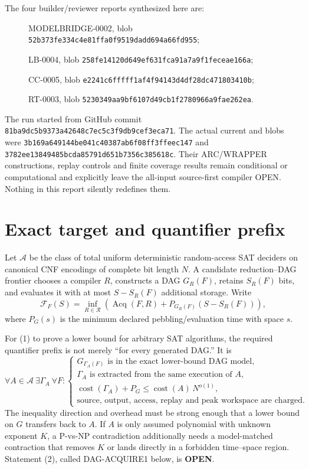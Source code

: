 \documentclass[11pt]{article}
\begin{document}
The four builder/reviewer reports synthesized here are:
\begin{description}
\item[] MODELBRIDGE-0002, blob
\texttt{52b373fe334c4e81ffa0f9519dadd694a66fd955};
\item[] LB-0004, blob
\texttt{258fe14120d649ef631fca91a7a9f1feceae166a};
\item[] CC-0005, blob
\texttt{e2241c6fffff1af4f94143d4df28dc471803410b};
\item[] RT-0003, blob
\texttt{5230349aa9bf6107d49cb1f2780966a9fae262ea}.
\end{description}
The run started from GitHub commit
\texttt{81ba9dc5b9373a42648c7ec5c3f9db9cef3eca71}.  The actual current
 and  blobs were
\texttt{3b169a649144be041c40387ab6f08ff3ffeec147} and
\texttt{3782ee13849485bcda85791d651b7356c385618c}.  Their ARC/WRAPPER
constructions, replay controls and finite coverage results remain conditional
or computational and explicitly leave the all-input source-first compiler
OPEN.  Nothing in this report silently redefines them.

\section{Exact target and quantifier prefix}
Let $\mathcal A$ be the class of total uniform deterministic random-access
SAT deciders on canonical CNF encodings of complete bit length $N$.  A
candidate reduction--DAG frontier chooses a compiler $R$, constructs a DAG
$G_R(F)$, retains $S_R(F)$ bits, and evaluates it with at most $S-S_R(F)$
additional storage.  Write
\[
 \mathcal F_F(S)=
 \inf_{R\in\mathcal R}
 \left(
   \operatorname{Acq}(F,R)+P_{G_R(F)}(S-S_R(F))
 \right),                                                   \tag{1}
\]
where $P_G(s)$ is the minimum declared pebbling/evaluation time with space
$s$.

For (1) to prove a lower bound for arbitrary SAT algorithms, the required
quantifier prefix is not merely ``for every generated DAG.''  It is
\[
 \forall A\in\mathcal A\ \exists\Gamma_A\ \forall F:
 \begin{cases}
 G_{\Gamma_A(F)}\text{ is in the exact lower-bound DAG model},\\
 \Gamma_A\text{ is extracted from the same execution of }A,\\
 \operatorname{cost}(\Gamma_A)+P_G\le
       \operatorname{cost}(A)\,N^{o(1)},\\
 \text{source, output, access, replay and peak workspace are charged.}
 \end{cases}                                                \tag{2}
\]
The inequality direction and overhead must be strong enough that a lower
bound on $G$ transfers back to $A$.  If $A$ is only assumed polynomial with
unknown exponent $K$, a P-vs-NP contradiction additionally needs a
model-matched contraction that removes $K$ or lands directly in a forbidden
time--space region.  Statement (2), called \textsf{DAG-ACQUIRE1} below, is
\textbf{OPEN}.
\end{document}

